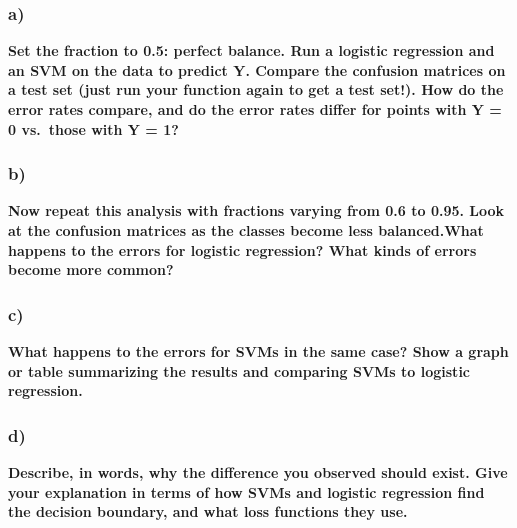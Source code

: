 \documentclass[]{article}
\begin{document}
\subsubsection{a)}\label{a-1}

\textbf{Set the fraction to 0.5: perfect balance. Run a logistic
regression and an SVM on the data to predict Y. Compare the confusion
matrices on a test set (just run your function again to get a test
set!). How do the error rates compare, and do the error rates differ for
points with Y = 0 vs.~those with Y = 1?}

\subsubsection{b)}\label{b-1}

\textbf{Now repeat this analysis with fractions varying from 0.6 to
0.95. Look at the confusion matrices as the classes become less
balanced.What happens to the errors for logistic regression? What kinds
of errors become more common?}

\subsubsection{c)}\label{c-1}

\textbf{What happens to the errors for SVMs in the same case? Show a
graph or table summarizing the results and comparing SVMs to logistic
regression.}

\subsubsection{d)}\label{d}

\textbf{Describe, in words, why the difference you observed should
exist. Give your explanation in terms of how SVMs and logistic
regression find the decision boundary, and what loss functions they
use.}
\end{document}
